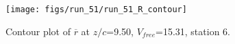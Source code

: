 \begin{figure}[H]
\centering
\texttt{[image: figs/run\_51/run\_51\_R\_contour]}
\caption{Contour plot of $\overline{r}$ at $z/c$=9.50, $V_{free}$=15.31, station 6.}
\end{figure}


